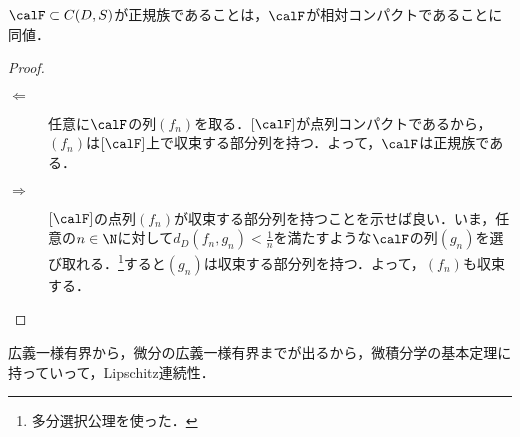 \documentclass[uplatex, dvipdfmx]{jsreport}
\begin{document}
\begin{theorem}[Montelの定理の超克]\label{thm-regular-family-and-relatively-compact}
    $\calF\subset C(D,S)$が正規族であることは，$\calF$が相対コンパクトであることに同値．
\end{theorem}
\begin{proof}\mbox{}
    \begin{description}
        \item[$\Leftarrow$] 任意に$\calF$の列$(f_n)$を取る．$[\calF]$が点列コンパクトであるから，$(f_n)$は$[\calF]$上で収束する部分列を持つ．よって，$\calF$は正規族である．
        \item[$\Rightarrow$] $[\calF]$の点列$(f_n)$が収束する部分列を持つことを示せば良い．いま，任意の$n\in\N$に対して$d_D(f_n,g_n)<\frac{1}{n}$を満たすような$\calF$の列$(g_n)$を選び取れる．\footnote{多分選択公理を使った．}すると$(g_n)$は収束する部分列を持つ．よって，$(f_n)$も収束する．
    \end{description}
\end{proof}
\begin{remarks}
    広義一様有界から，微分の広義一様有界までが出るから，微積分学の基本定理に持っていって，Lipschitz連続性．
\end{remarks}
\end{document}
